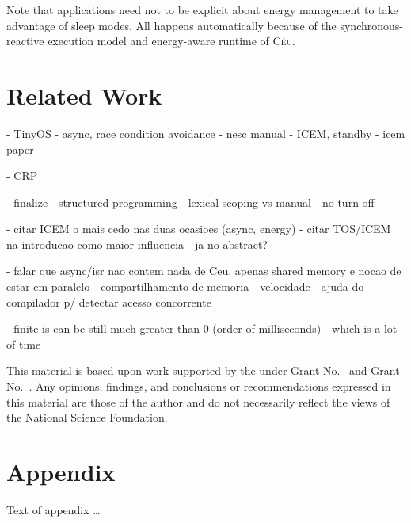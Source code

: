 \documentclass[sigplan,10pt,review,anonymous]{acmart}\settopmatter{printfolios=true,printccs=false,printacmref=false}
\newcommand{\CEU}{\textsc{C\'{e}u}\xspace}
\begin{document}
Note that applications need not to be explicit about energy management to take
advantage of sleep modes.
All happens automatically because of the synchronous-reactive execution model
and energy-aware runtime of \CEU.

\section{Related Work}

- TinyOS
    - async, race condition avoidance
        - nesc manual
    - ICEM, standby
        - icem paper

- CRP

- finalize
- structured programming
    - lexical scoping vs manual
    - no turn off

- citar ICEM o mais cedo nas duas ocasioes (async, energy)
- citar TOS/ICEM na introducao como maior influencia
    - ja no abstract?

- falar que async/isr nao contem nada de Ceu, apenas shared memory e nocao de estar em paralelo
    - compartilhamento de memoria
        - velocidade
    - ajuda do compilador p/ detectar acesso concorrente

- finite is can be still much greater than 0 (order of milliseconds)
    - which is a lot of time

\begin{acks}                            %
  This material is based upon work supported by the
   under Grant
  No.~ and Grant
  No.~.  Any opinions, findings, and
  conclusions or recommendations expressed in this material are those
  of the author and do not necessarily reflect the views of the
  National Science Foundation.
\end{acks}





\appendix
\section{Appendix}

Text of appendix \ldots
\end{document}
